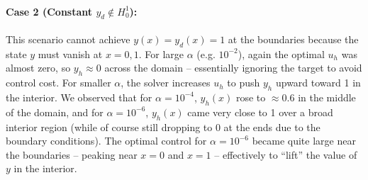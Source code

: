 \paragraph{Case 2 (Constant $y_d\notin H^1_0$):}
This scenario cannot achieve $y(x)=y_d(x)=1$ at the boundaries because the state $y$ must vanish at $x=0,1$. For large $\alpha$ (e.g. $10^{-2}$), again the optimal $u_h$ was almost zero, so $y_h\approx 0$ across the domain -- essentially ignoring the target to avoid control cost. For smaller $\alpha$, the solver increases $u_h$ to push $y_h$ upward toward 1 in the interior. We observed that for $\alpha=10^{-4}$, $y_h(x)$ rose to $\approx 0.6$ in the middle of the domain, and for $\alpha=10^{-6}$, $y_h(x)$ came very close to 1 over a broad interior region (while of course still dropping to 0 at the ends due to the boundary conditions). The optimal control for $\alpha=10^{-6}$ became quite large near the boundaries -- peaking near $x=0$ and $x=1$ -- effectively to ``lift'' the value of $y$ in the interior.

